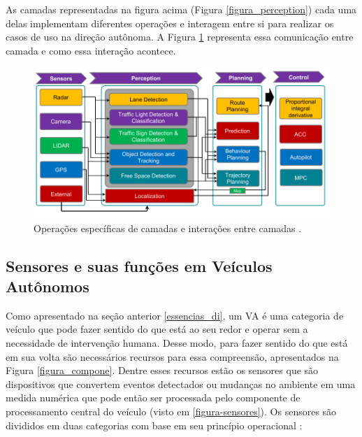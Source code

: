 As camadas representadas na figura acima (Figura \ref{figura_perception}) cada uma delas implementam diferentes operações e interagem entre si para realizar os casos de uso na direção autônoma. A Figura \ref{figura_camadas} representa essa comunicação entre camada e como essa interação acontece.

\begin{figure}[H]
\centering
\includegraphics[width=\textwidth]{Figures/layer-sens.png}
\caption{Operações específicas de camadas e interações entre camadas \cite{sensors-yet}.}
\label{figura_camadas}
\end{figure}



\subsection{Sensores e suas funções em Veículos Autônomos} \label{sensores-a}

Como apresentado na seção anterior \ref{essencias_di}, um VA é uma categoria de veículo que pode fazer sentido do que está ao seu redor e operar sem a necessidade de intervenção humana. Desse modo, para fazer sentido do que está em sua volta são necessários recursos para essa compreensão, apresentados na Figura \ref{figura_compone}. Dentre esses recursos estão os sensores que são dispositivos que convertem eventos detectados ou mudanças no ambiente em uma medida numérica que pode então ser processada pelo componente de processamento central do veículo (visto em \ref{figura-sensores}). 
Os sensores são divididos em duas categorias com base em seu princípio operacional \cite{sensors}:  

